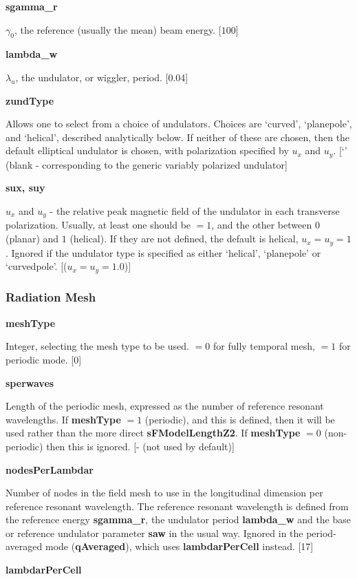 \documentclass[12pt]{article}%
\begin{document}
{\bf sgamma\_r}

$\gamma_0$, the reference (usually the mean) beam energy. [$100$]

{\bf lambda\_w}

$\lambda_u$, the undulator, or wiggler, period. [0.04]

{\bf zundType}

Allows one to select from a choice of undulators. Choices are `curved', `planepole', and `helical', described analytically below. If neither of these are chosen, then the default elliptical undulator is chosen, with polarization specified by $u_x$ and $u_y$. [`' (blank - corresponding to the generic variably polarized undulator]

{\bf sux, suy}

$u_x$ and $u_y$ - the relative peak magnetic field of the undulator in each transverse polarization. Usually, at least one should be $=1$, and the other between $0$ (planar) and $1$ (helical). If they are not defined, the default is helical, $u_x=u_y=1$. Ignored if the undulator type is specified as either `helical', `planepole' or `curvedpole'. [($u_x = u_y = 1.0$)]


\subsubsection{Radiation Mesh}

{\bf meshType}

Integer, selecting the mesh type to be used. $= 0$ for fully temporal mesh, $=1$ for periodic mode. [0]

{\bf sperwaves}

Length of the periodic mesh, expressed as the number of reference resonant wavelengths. If {\bf meshType} $=1$ (periodic), and this is defined, then it will be used rather than the more direct {\bf sFModelLengthZ2}. If {\bf meshType} $=0$ (non-periodic) then this is ignored. [- (not used by default)] 

{\bf nodesPerLambdar}

Number of nodes in the field mesh to use in the longitudinal dimension per reference resonant wavelength. The reference resonant wavelength is defined from the reference energy {\bf sgamma\_r}, the undulator period {\bf lambda\_w} and the base or reference undulator parameter {\bf saw} in the usual way. Ignored in the period-averaged mode ({\bf qAveraged}), which uses {\bf lambdarPerCell} instead. [17]

{\bf lambdarPerCell}
\end{document}
